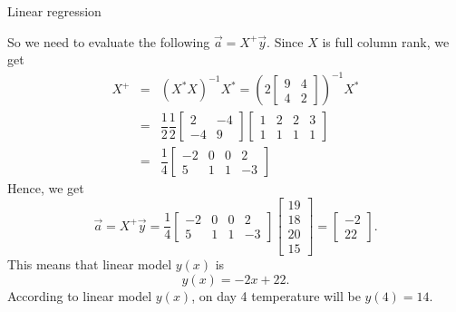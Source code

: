 \begin{problem}{Linear regression}
\begin{solution}
$$                $$
                So we need to evaluate the following $\vec{a}=X^+\vec{y}$. Since $X$ is full column rank, we get 
                \begin{eqnarray}
                    X^+&=&(X^*X)^{-1}X^*
                    =\left(2
                    \begin{bmatrix}
                        9 & 4\\
                        4 & 2
                    \end{bmatrix}
                    \right)^{-1}
                    X^*\nonumber\\
                    &=&
                    \dfrac{1}{2}
                    \dfrac{1}{2}
                    \begin{bmatrix}
                        2 & -4\\
                        -4 & 9
                    \end{bmatrix}
                    \begin{bmatrix}
                        1 & 2 & 2 & 3\\
                        1 & 1 & 1 & 1
                    \end{bmatrix}\nonumber\\
                    &=&
                    \dfrac{1}{4}
                    \begin{bmatrix}
                        -2 & 0 & 0 & 2\\
                        5 & 1 & 1 & -3
                    \end{bmatrix}\nonumber
                \end{eqnarray}
                Hence, we get
                $$
                    \vec{a}=
                    X^+\vec{y}=
                    \dfrac{1}{4}
                    \begin{bmatrix}
                        -2 & 0 & 0 & 2\\
                        5 & 1 & 1 & -3
                    \end{bmatrix} 
                    \begin{bmatrix}
                        19\\
                        18\\
                        20\\
                        15
                    \end{bmatrix}
                    =
                    \begin{bmatrix}
                        -2\\
                        22
                    \end{bmatrix}.
                $$
                This means that linear model $y(x)$ is 
                $$
                    y(x)=-2x+22.
                $$
                According to linear model $y(x)$, on day 4 temperature will be $y(4)=14$\textdegree.
            \end{solution}
        \end{problem}